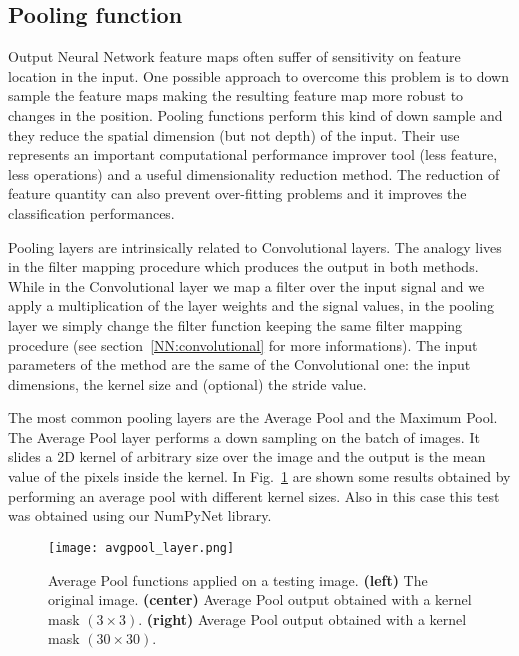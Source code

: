 \documentclass{standalone}
\begin{document}
\subsection[Pooling function]{Pooling function}\label{NN:pooling}

Output Neural Network feature maps often suffer of sensitivity on feature location in the input.
One possible approach to overcome this problem is to down sample the feature maps making the resulting feature map more robust to changes in the position.
Pooling functions perform this kind of down sample and they reduce the spatial dimension (but not depth) of the input.
Their use represents an important computational performance improver tool (less feature, less operations) and a useful dimensionality reduction method.
The reduction of feature quantity can also prevent over-fitting problems and it improves the classification performances.

Pooling layers are intrinsically related to Convolutional layers.
The analogy lives in the filter mapping procedure which produces the output in both methods.
While in the Convolutional layer we map a filter over the input signal and we apply a multiplication of the layer weights and the signal values, in the pooling layer we simply change the filter function keeping the same filter mapping procedure (see section~\ref{NN:convolutional} for more informations).
The input parameters of the method are the same of the Convolutional one: the input dimensions, the kernel size and (optional) the stride value.

The most common pooling layers are the Average Pool and the Maximum Pool.
The Average Pool layer performs a down sampling on the batch of images.
It slides a 2D kernel of arbitrary size over the image and the output is the mean value of the pixels inside the kernel.
In Fig.~\ref{fig:avgpool} are shown some results obtained by performing an average pool with different kernel sizes.
Also in this case this test was obtained using our \textsf{NumPyNet} library.

\begin{center}
\begin{figure}[htbp]
\centering
\texttt{[image: avgpool\_layer.png]}
\caption{Average Pool functions applied on a testing image.
\textbf{(left)} The original image.
\textbf{(center)} Average Pool output obtained with a kernel mask $(3\times 3)$.
\textbf{(right)} Average Pool output obtained with a kernel mask $(30\times 30)$.
}
\label{fig:avgpool}
\end{figure}
\end{center}
\end{document}
